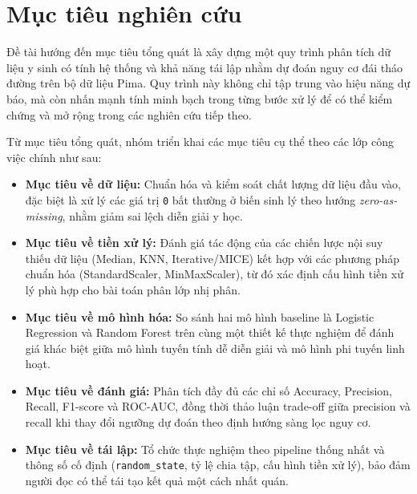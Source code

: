 \section{Mục tiêu nghiên cứu}
Đề tài hướng đến mục tiêu tổng quát là xây dựng một quy trình phân tích dữ liệu y sinh có tính hệ thống và khả năng tái lập
nhằm dự đoán nguy cơ đái tháo đường trên bộ dữ liệu Pima. Quy trình này không chỉ tập trung vào hiệu năng dự báo, mà còn nhấn
mạnh tính minh bạch trong từng bước xử lý để có thể kiểm chứng và mở rộng trong các nghiên cứu tiếp theo.

Từ mục tiêu tổng quát, nhóm triển khai các mục tiêu cụ thể theo các lớp công việc chính như sau:
\begin{itemize}[leftmargin=1.5em]
    \item \textbf{Mục tiêu về dữ liệu:} Chuẩn hóa và kiểm soát chất lượng dữ liệu đầu vào, đặc biệt là xử lý các giá trị
    \texttt{0} bất thường ở biến sinh lý theo hướng \textit{zero-as-missing}, nhằm giảm sai lệch diễn giải y học.

    \item \textbf{Mục tiêu về tiền xử lý:} Đánh giá tác động của các chiến lược nội suy thiếu dữ liệu (Median, KNN,
    Iterative/MICE) kết hợp với các phương pháp chuẩn hóa (StandardScaler, MinMaxScaler), từ đó xác định cấu hình tiền xử lý
    phù hợp cho bài toán phân lớp nhị phân.

    \item \textbf{Mục tiêu về mô hình hóa:} So sánh hai mô hình baseline là Logistic Regression và Random Forest trên cùng
    một thiết kế thực nghiệm để đánh giá khác biệt giữa mô hình tuyến tính dễ diễn giải và mô hình phi tuyến linh hoạt.

    \item \textbf{Mục tiêu về đánh giá:} Phân tích đầy đủ các chỉ số Accuracy, Precision, Recall, F1-score và ROC-AUC,
    đồng thời thảo luận trade-off giữa precision và recall khi thay đổi ngưỡng dự đoán theo định hướng sàng lọc nguy cơ.

    \item \textbf{Mục tiêu về tái lập:} Tổ chức thực nghiệm theo pipeline thống nhất và thông số cố định (\texttt{random\_state},
    tỷ lệ chia tập, cấu hình tiền xử lý), bảo đảm người đọc có thể tái tạo kết quả một cách nhất quán.
\end{itemize}

